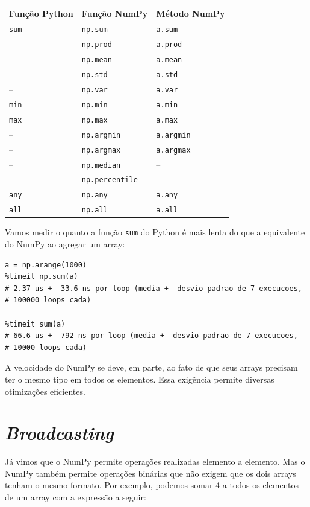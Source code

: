 \documentclass[11pt,a4paper]{article}
\begin{document}
\begin{center}
\begin{tabular}{lll}
\toprule
\textbf{Função Python} & \textbf{Função NumPy} & \textbf{Método NumPy} \\
\midrule
\texttt{sum} & \texttt{np.sum} & \texttt{a.sum} \\
-- & \texttt{np.prod} & \texttt{a.prod} \\
-- & \texttt{np.mean} & \texttt{a.mean} \\
-- & \texttt{np.std} & \texttt{a.std} \\
-- & \texttt{np.var} & \texttt{a.var} \\
\texttt{min} & \texttt{np.min} & \texttt{a.min} \\
\texttt{max} & \texttt{np.max} & \texttt{a.max} \\
-- & \texttt{np.argmin} & \texttt{a.argmin} \\
-- & \texttt{np.argmax} & \texttt{a.argmax} \\
-- & \texttt{np.median} & -- \\
-- & \texttt{np.percentile} & -- \\
\texttt{any} & \texttt{np.any} & \texttt{a.any} \\
\texttt{all} & \texttt{np.all} & \texttt{a.all} \\
\bottomrule
\end{tabular}
\end{center}

Vamos medir o quanto a função \texttt{sum} do Python é mais lenta do que
a equivalente do NumPy ao agregar um array:

\begin{lstlisting}
a = np.arange(1000)
%timeit np.sum(a)
# 2.37 us +- 33.6 ns por loop (media +- desvio padrao de 7 execucoes,
# 100000 loops cada)

%timeit sum(a)
# 66.6 us +- 792 ns por loop (media +- desvio padrao de 7 execucoes,
# 10000 loops cada)
\end{lstlisting}

A velocidade do NumPy se deve, em parte, ao fato de que seus arrays
precisam ter o mesmo tipo em todos os elementos. Essa exigência permite
diversas otimizações eficientes.

\section{\emph{Broadcasting}}

Já vimos que o NumPy permite operações realizadas elemento a elemento.
Mas o NumPy também permite operações binárias que não exigem que os dois
arrays tenham o mesmo formato. Por exemplo, podemos somar 4 a todos os
elementos de um array com a expressão a seguir:
\end{document}
